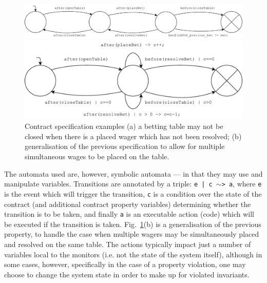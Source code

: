 \documentclass{article}
\begin{document}
\begin{figure} 
\centerline{\includegraphics[scale=0.5]{images/example-1.pdf}}
\bigskip
\centerline{\includegraphics[scale=0.5]{images/example-2.pdf}}
\caption{Contract specification examples (a) a betting table may not be closed when there is a placed wager which has not been resolved; (b) generalisation of the previous specification to allow for multiple simultaneous wages to be placed on the table.}
\label{f:specifications}
\end{figure}

The automata used are, however, symbolic automata --- in that they may use and manipulate variables. Transitions are annotated by a triple: \texttt{e | c $\sim$> a}, where \texttt{e} is the event which will trigger the transition, \texttt{c} is a condition over the state of the contract (and additional contract property variables) determining whether the transition is to be taken, and finally \texttt{a} is an executable action (code) which will be executed if the transition is taken. Fig.~\ref{f:specifications}(b) is a generalisation of the previous property, to handle the case when multiple wagers may be simultaneously placed and resolved on the same table. The actions typically impact just a number of variables local to the monitors (i.e. not the state of the system itself), although in some cases, however, specifically in the case of a property violation, one may choose to change the system state in order to make up for violated invariants.

%
\end{document}
